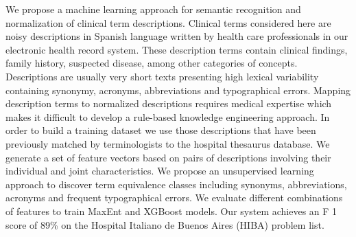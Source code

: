 We propose a machine learning approach for semantic recognition and normalization of clinical term descriptions. Clinical terms considered here are noisy descriptions in Spanish language written by health care professionals in our electronic health record system. These description terms contain clinical findings, family history, suspected disease, among other categories of concepts. Descriptions are usually very short texts presenting high lexical variability containing synonymy, acronyms, abbreviations and typographical errors. Mapping description terms to normalized descriptions requires medical expertise which makes it difficult to develop a rule-based knowledge engineering approach. In order to build a training dataset we use those descriptions that have been previously matched by terminologists to the hospital thesaurus database. We generate a set of feature vectors based on pairs of descriptions involving their individual and joint characteristics. We propose an unsupervised learning approach to discover term equivalence classes including synonyms, abbreviations, acronyms and frequent typographical errors. We evaluate different combinations of features to train MaxEnt and XGBoost models. Our system achieves an F 1 score of 89\% on the Hospital Italiano de Buenos Aires (HIBA) problem list.
